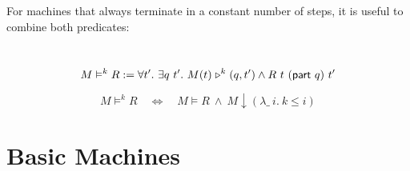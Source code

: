 For machines that always terminate in a constant number of steps, it is useful to combine both predicates:
\begin{definition}
  \label{def:RealiseIn}
  ~
  \[
    M \vDash^k R :=
    \forall t'.~
    \exists q~t'.~
    M(t) \mathrel{\triangleright}^k(q, t') \land R~t~(\textsf{part}~q)~t'
  \]
\end{definition}

\begin{lemma}
  \label{lem:Realise_total}
  \[
    M \vDash^k R
    \quad\iff\quad
    M \vDash R ~\land~
    M \downarrow (\lambda \_~i.~k \le i)
  \]
\end{lemma}



\section{Basic Machines}
\label{sec:basic_machines}

